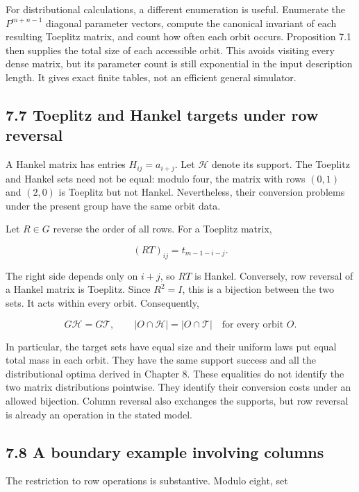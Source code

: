\documentclass[
]{article}
\begin{document}
For distributional calculations, a different enumeration is useful.
Enumerate the \(P^{m+n-1}\) diagonal parameter vectors, compute the
canonical invariant of each resulting Toeplitz matrix, and count how
often each orbit occurs. Proposition 7.1 then supplies the total size of
each accessible orbit. This avoids visiting every dense matrix, but its
parameter count is still exponential in the input description length. It
gives exact finite tables, not an efficient general simulator.

\subsection{7.7 Toeplitz and Hankel targets under row
reversal}\label{toeplitz-and-hankel-targets-under-row-reversal}

A Hankel matrix has entries \(H_{ij}=a_{i+j}\). Let \(\mathcal H\)
denote its support. The Toeplitz and Hankel sets need not be equal:
modulo four, the matrix with rows \((0,1)\) and \((2,0)\) is Toeplitz
but not Hankel. Nevertheless, their conversion problems under the
present group have the same orbit data.

Let \(R\in G\) reverse the order of all rows. For a Toeplitz matrix,

\[
(RT)_{ij}=t_{m-1-i-j}.
\]

The right side depends only on \(i+j\), so \(RT\) is Hankel. Conversely,
row reversal of a Hankel matrix is Toeplitz. Since \(R^2=I\), this is a
bijection between the two sets. It acts within every orbit.
Consequently,

\[
G\mathcal H=G\mathcal T,\qquad
|O\cap\mathcal H|=|O\cap\mathcal T|
\quad\text{for every orbit }O.
\]

In particular, the target sets have equal size and their uniform laws
put equal total mass in each orbit. They have the same support success
and all the distributional optima derived in Chapter 8. These equalities
do not identify the two matrix distributions pointwise. They identify
their conversion costs under an allowed bijection. Column reversal also
exchanges the supports, but row reversal is already an operation in the
stated model.

\subsection{7.8 A boundary example involving
columns}\label{a-boundary-example-involving-columns}

The restriction to row operations is substantive. Modulo eight, set
\end{document}
